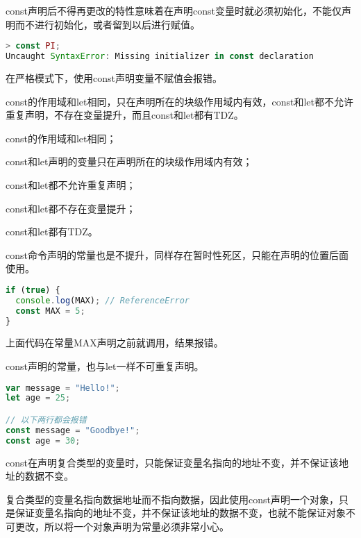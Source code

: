 const声明后不得再更改的特性意味着在声明const变量时就必须初始化，不能仅声明而不进行初始化，或者留到以后进行赋值。





\begin{lstlisting}[language=JavaScript]
> const PI;
Uncaught SyntaxError: Missing initializer in const declaration
\end{lstlisting}

在严格模式下，使用const声明变量不赋值会报错。

const的作用域和let相同，只在声明所在的块级作用域内有效，const和let都不允许重复声明，不存在变量提升，而且const和let都有TDZ。

\begin{compactitem}
\item const的作用域和let相同；
\item const和let声明的变量只在声明所在的块级作用域内有效；
\item const和let都不允许重复声明；
\item const和let都不存在变量提升；
\item const和let都有TDZ。
\end{compactitem}

const命令声明的常量也是不提升，同样存在暂时性死区，只能在声明的位置后面使用。


\begin{lstlisting}[language=JavaScript]
if (true) {
  console.log(MAX); // ReferenceError
  const MAX = 5;
}
\end{lstlisting}


上面代码在常量MAX声明之前就调用，结果报错。

const声明的常量，也与let一样不可重复声明。

\begin{lstlisting}[language=JavaScript]
var message = "Hello!";
let age = 25;

// 以下两行都会报错
const message = "Goodbye!";
const age = 30;
\end{lstlisting}

const在声明复合类型的变量时，只能保证变量名指向的地址不变，并不保证该地址的数据不变。

复合类型的变量名指向数据地址而不指向数据，因此使用const声明一个对象，只是保证变量名指向的地址不变，并不保证该地址的数据不变，也就不能保证对象不可更改，所以将一个对象声明为常量必须非常小心。








